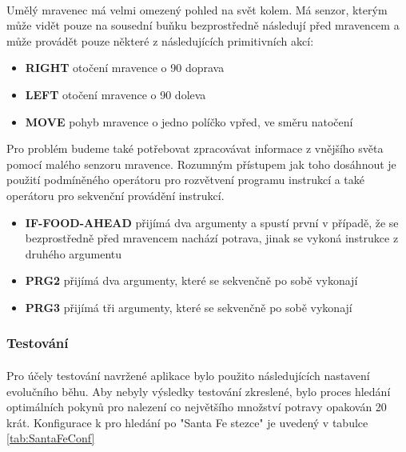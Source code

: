 \documentclass[bc,male,java,dept460]{diploma}		%
\begin{document}

\paragraph*{}
Umělý mravenec má velmi omezený pohled na svět kolem. Má senzor, kterým může vidět pouze na sousední buňku bezprostředně následují před mravencem a může provádět pouze některé z následujících primitivních akcí:

\begin{itemize}
\item \textbf{RIGHT} otočení mravence o 90 doprava
\item \textbf{LEFT} otočení mravence o 90 doleva
\item \textbf{MOVE} pohyb mravence o jedno políčko vpřed, ve směru natočení
\end{itemize}

Pro problém budeme také potřebovat zpracovávat informace z vnějšího světa pomocí malého senzoru mravence. Rozumným přístupem jak toho dosáhnout je použití podmíněného operátoru pro rozvětvení programu instrukcí a také operátoru pro sekvenční provádění instrukcí.

\begin{itemize}
\item \textbf{IF-FOOD-AHEAD} přijímá dva argumenty a spustí první v případě, že se bezprostředně před mravencem nachází potrava, jinak se vykoná instrukce z druhého argumentu
\item \textbf{PRG2} přijímá dva argumenty, které se sekvenčně po sobě vykonají
\item \textbf{PRG3} přijímá tři argumenty, které se sekvenčně po sobě vykonají
\end{itemize}

\subsubsection{Testování}
\paragraph*{}
Pro účely testování navržené aplikace bylo použito následujících nastavení evolučního běhu. Aby nebyly výsledky testování zkreslené, bylo proces hledání optimálních pokynů pro nalezení co největšího množství potravy opakován 20 krát. Konfigurace k pro hledání po "Santa Fe stezce" je uvedený v tabulce \ref{tab:SantaFeConf} 
\end{document}
